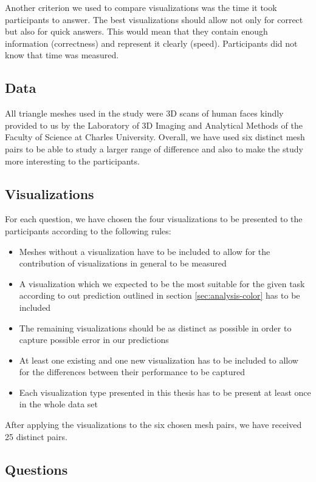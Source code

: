 Another criterion we used to compare visualizations was the time it took participants to answer. The best visualizations should allow not only for correct but also for quick answers. This would mean that they contain enough information (correctness) and represent it clearly (speed). Participants did not know that time was measured.

\subsection{Data}

All triangle meshes used in the study were 3D scans of human faces kindly provided to us by the Laboratory of 3D Imaging and Analytical Methods of the Faculty of Science at Charles University. Overall, we have used six distinct mesh pairs to be able to study a larger range of difference and also to make the study more interesting to the participants.

\subsection{Visualizations}

For each question, we have chosen the four visualizations to be presented to the participants according to the following rules:

\begin{itemize}
\item Meshes without a visualization have to be included to allow for the contribution of visualizations in general to be measured
\item A visualization which we expected to be the most suitable for the given task according to out prediction outlined in section \ref{sec:analysis-color} has to be included
\item The remaining visualizations should be as distinct as possible in order to capture possible error in our predictions
\item At least one existing and one new visualization has to be included to allow for the differences between their performance to be captured
\item Each visualization type presented in this thesis has to be present at least once in the whole data set
\end{itemize}

After applying the visualizations to the six chosen mesh pairs, we have received 25 distinct pairs.

\subsection{Questions}

